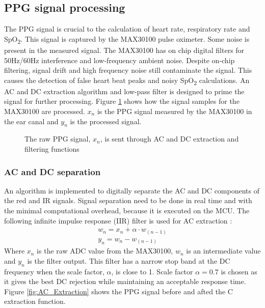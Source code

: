 \subsection{PPG signal processing}
The PPG signal is crucial to the calculation of heart rate, respiratory rate and SpO\textsubscript{2}. This signal is captured by the MAX30100 pulse oximeter. Some noise is present in the measured signal. The MAX30100 has on chip digital filters for 50Hz/60Hz interference and low-frequency ambient noise. Despite on-chip filtering, signal drift and high frequency noise still contaminate the signal. This causes the detection of false heart beat peaks and noisy SpO\textsubscript{2} calculations. An AC and DC extraction algorithm and low-pass filter is designed to prime the signal for further processing. Figure \ref{fig:PPG_Filtering} shows how the signal samples for the MAX30100 are processed.  $x_n$ is the PPG signal measured by the MAX30100 in the ear canal and $y_n$ is the processed signal.

\begin{figure}[H]
\centering
\graphicspath{{figs/}}

\caption{The raw PPG signal, $x_n$, is sent through AC and DC extraction and filtering functions}
\label{fig:PPG_Filtering}
\end{figure}

\subsubsection{AC and DC separation}
An algorithm is implemented to digitally separate the AC and DC components of the red and IR signals. Signal separation need to be done in real time and with the minimal computational overhead, because it is executed on the MCU. The following infinite impulse response (IIR) filter is used for AC extraction \citep{koblenski2015everyday}:
\begin{align}
\label{eq:AC_Extraction}
w_n= x_n  + \alpha\cdot w_{(n-1)}\\
y_n  = w_n  - w_{(n-1)}
\end{align}
Where $x_n$ is the raw ADC value from the MAX30100, $w_n$ is an intermediate value and $y_n$ is the filter output. This filter has a narrow stop band at the DC frequency when the scale factor,  $\alpha$, is close to 1. Scale factor $\alpha=0.7$ is chosen as it gives the best DC rejection while maintaining an acceptable response time. Figure \ref{fig:AC_Extraction} shows the PPG signal before and afted the C extraction function.

